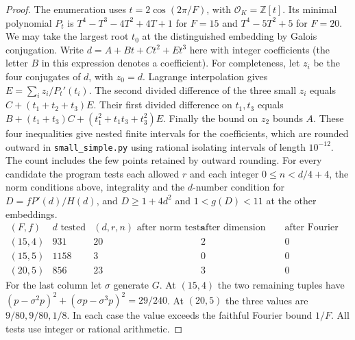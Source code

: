 \documentclass[11pt,a4paper]{article}
\numberwithin{equation}{section}
\begin{document}
\begin{proof}
The enumeration uses $t=2\cos(2\pi/F)$, with $\mathcal O_K=\mathbb Z[t]$. Its minimal polynomial $P_t$ is $T^4-T^3-4T^2+4T+1$ for $F=15$ and $T^4-5T^2+5$ for $F=20$. We may take the largest root $t_0$ at the distinguished embedding by Galois conjugation. Write $d=A+Bt+Ct^2+Et^3$ here with integer coefficients (the letter $B$ in this expression denotes a coefficient). For completeness, let $z_i$ be the four conjugates of $d$, with $z_0=d$. Lagrange interpolation gives $E=\sum_i z_i/P_t'(t_i)$. The second divided difference of the three small $z_i$ equals $C+(t_1+t_2+t_3)E$. Their first divided difference on $t_1,t_3$ equals $B+(t_1+t_3)C+(t_1^2+t_1t_3+t_3^2)E$. Finally the bound on $z_2$ bounds $A$. These four inequalities give nested finite intervals for the coefficients, which are rounded outward in \texttt{small\_simple.py} using rational isolating intervals of length $10^{-12}$. The count includes the few points retained by outward rounding. For every candidate the program tests each allowed $r$ and each integer $0\le n<d/4+4$, the norm conditions above, integrality and the $d$-number condition for $D=fP'(d)/H(d)$, and $D\ge1+4d^2$ and $1<g(D)<11$ at the other embeddings.
\[
\begin{array}{c|r|r|r|r}
(F,f)&d\text{ tested}&(d,r,n)\text{ after norm tests}
 &\text{after dimension tests}&\text{after Fourier test}\\\hline
(15,4)&931&20&2&0\\
(15,5)&1158&3&0&0\\
(20,5)&856&23&3&0
\end{array}
\]
For the last column let $\sigma$ generate $G$. At $(15,4)$ the two remaining tuples have $(p-\sigma^2p)^2+(\sigma p-\sigma^3p)^2=29/240$. At $(20,5)$ the three values are $9/80,9/80,1/8$. In each case the value exceeds the faithful Fourier bound $1/F$. All tests use integer or rational arithmetic.
\end{proof}



\end{document}
